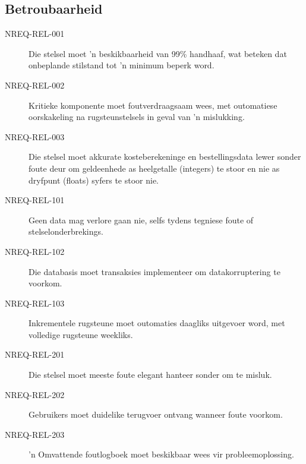 \subsection{Betroubaarheid}
\begin{description}
  \item[NREQ-REL-001] Die stelsel moet 'n beskikbaarheid van 99\% handhaaf, wat beteken dat onbeplande stilstand tot 'n minimum beperk word.
  \item[NREQ-REL-002] Kritieke komponente moet foutverdraagsaam wees, met outomatiese oorskakeling na rugsteunstelsels in geval van 'n mislukking.
  \item[NREQ-REL-003] Die stelsel moet akkurate kosteberekeninge en bestellingsdata lewer sonder foute deur om geldeenhede as heelgetalle (integers) te stoor en nie as dryfpunt (floats) syfers te stoor nie.
  \item[NREQ-REL-101] Geen data mag verlore gaan nie, selfs tydens tegniese foute of stelselonderbrekings.
  \item[NREQ-REL-102] Die databasis moet transaksies implementeer om datakorruptering te voorkom.
  \item[NREQ-REL-103] Inkrementele rugsteune moet outomaties daagliks uitgevoer word, met volledige rugsteune weekliks.
  \item[NREQ-REL-201] Die stelsel moet meeste foute elegant hanteer sonder om te misluk.
  \item[NREQ-REL-202] Gebruikers moet duidelike terugvoer ontvang wanneer foute voorkom.
  \item[NREQ-REL-203] 'n Omvattende foutlogboek moet beskikbaar wees vir probleemoplossing.
\end{description}


